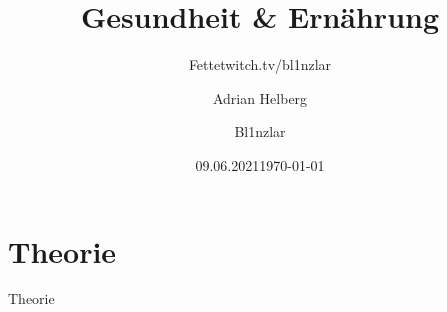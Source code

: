 \documentclass[xcolor=dvipsnames]{beamer}
\title{Gesundheit \& Ernährung}
\subtitle{Fette}
\author{Adrian Helberg}
\date{09.06.2021}
\subtitle{twitch.tv/bl1nzlar}
\author{Bl1nzlar}
\date{\today}
\begin{document}
    \maketitle


    \section{Theorie}
    {
    \begin{frame}
        \begin{center}
            \Huge Theorie
        \end{center}
    \end{frame}
    }
\end{document}
